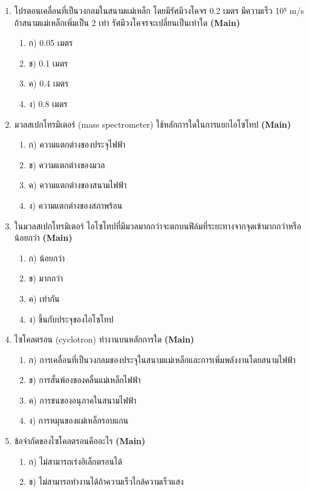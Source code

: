 \documentclass[12pt]{article}
\begin{document}
\begin{enumerate}[label=\arabic*.]
\begin{enumerate}[label=)]
\end{enumerate}
\item โปรตอนเคลื่อนที่เป็นวงกลมในสนามแม่เหล็ก โดยมีรัศมีวงโคจร 0.2 เมตร มีความเร็ว 10⁵ m/s ถ้าสนามแม่เหล็กเพิ่มเป็น 2 เท่า รัศมีวงโคจรจะเปลี่ยนเป็นเท่าใด \hfill \textbf{\small (Main)}
\begin{enumerate}[label=)]
\item ก) 0.05 เมตร
\item ข) 0.1 เมตร
\item ค) 0.4 เมตร
\item ง) 0.8 เมตร
\end{enumerate}
\item มวลสเปกโทรมิเตอร์ (mass spectrometer) ใช้หลักการใดในการแยกไอโซโทป \hfill \textbf{\small (Main)}
\begin{enumerate}[label=)]
\item ก) ความแตกต่างของประจุไฟฟ้า
\item ข) ความแตกต่างของมวล
\item ค) ความแตกต่างของสนามไฟฟ้า
\item ง) ความแตกต่างของสภาพร้อน
\end{enumerate}
\item ในมวลสเปกโทรมิเตอร์ ไอโซโทปที่มีมวลมากกว่าจะตกบนฟิล์มที่ระยะทางจากจุดเข้ามากกว่าหรือน้อยกว่า \hfill \textbf{\small (Main)}
\begin{enumerate}[label=)]
\item ก) น้อยกว่า
\item ข) มากกว่า
\item ค) เท่ากัน
\item ง) ขึ้นกับประจุของไอโซโทป
\end{enumerate}
\item ไซโคลตรอน (cyclotron) ทำงานบนหลักการใด \hfill \textbf{\small (Main)}
\begin{enumerate}[label=)]
\item ก) การเคลื่อนที่เป็นวงกลมของประจุในสนามแม่เหล็กและการเพิ่มพลังงานโดยสนามไฟฟ้า
\item ข) การสั่นพ้องของคลื่นแม่เหล็กไฟฟ้า
\item ค) การชนของอนุภาคในสนามไฟฟ้า
\item ง) การหมุนของแม่เหล็กรอบแกน
\end{enumerate}
\item ข้อจำกัดของไซโคลตรอนคืออะไร \hfill \textbf{\small (Main)}
\begin{enumerate}[label=)]
\item ก) ไม่สามารถเร่งอิเล็กตรอนได้
\item ข) ไม่สามารถทำงานได้ถ้าความเร็วใกล้ความเร็วแสง

\end{enumerate}
\end{enumerate}
\end{document}
